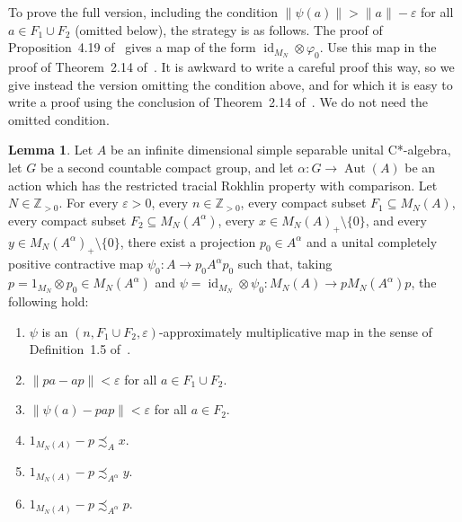 \documentclass[10pt]{amsart}
\numberwithin{equation}{section}
\theoremstyle{definition}
\newtheorem{lem}[thm]{Lemma}
\newcommand{\ep}{\varepsilon}
\newcommand{\ph}{\varphi}
\newcommand{\ps}{\psi}
\newcommand{\N}{{\mathbb{Z}}_{> 0}}
\newcommand{\id}{{\operatorname{id}}}
\newcommand{\Aut}{{\operatorname{Aut}}}
\newcommand{\ca}{C*-algebra}
\begin{document}
To prove the full version, including the condition
$\| \ps (a) \| > \| a \| - \ep$ for all $a \in F_{1} \cup F_{2}$
(omitted below), the strategy is as follows.
The proof of Proposition~4.19 of~\cite{MohPhil2021TRP}
gives a map of the form $\id_{M_N} \otimes \ph_0$.
Use this map in the proof of Theorem~2.14 of~\cite{MohPhil2021TRP}.
It is awkward to write a careful proof this way,
so we give instead the version omitting the condition above,
and for which it is easy to write a proof using the conclusion of
Theorem~2.14 of~\cite{MohPhil2021TRP}.
We do not need the omitted condition.

\begin{lem}\label{L_6327_TRP_Mn}
Let $A$ be an infinite dimensional simple separable unital \ca,
let $G$ be a second countable compact group, and let
$\alpha \colon G \to \Aut (A)$ be an action which has the
restricted tracial Rokhlin property with comparison.
Let $N \in \N$.
For every $\ep > 0$, every $n \in \N$,
every compact subset $F_{1} \subseteq M_N (A)$,
every compact subset $F_2 \subseteq M_N (A^{\alpha})$,
every $x \in M_N (A)_{+} \setminus \{ 0 \}$,
and every $y \in M_N (A^{\alpha})_{+} \setminus \{ 0 \}$, there exist
a projection $p_0 \in A^{\alpha}$ and a
unital completely positive contractive map
$\psi_0 \colon A \to p_0 A^{\alpha} p_0$ such that,
taking $p = 1_{M_N} \otimes p_0 \in M_N (A^{\alpha})$
and $\ps = \id_{M_N} \otimes \psi_0 \colon M_N (A) \to p M_N (A^{\alpha}) p$,
the following hold:
%
\begin{enumerate}
%
\item\label{Item_1X07_18}
$\ps$ is an $(n, F_1 \cup F_2, \ep)$-approximately
multiplicative map in the sense of Definition~1.5 of~\cite{MohPhil2021TRP}.
%
\item\label{commute1469}
$\| p a - a p \| < \varepsilon$
for all $a \in F_{1} \cup F_{2}$.
%
\item\label{Item_1X07_21}
$\| \psi (a) - p a p \| < \ep$
for all $a \in F_2$.
%
\item\label{Item_1X07_19}
$1_{M_N (A)} - p \precsim_{A} x$.
%
\item\label{Item_1X07_20}
$1_{M_N (A)} - p \precsim_{A^{\alpha}} y$.
%
\item\label{Item_1X07_20p}
$1_{M_N (A)} - p \precsim_{A^{\alpha}} p$.
%
\end{enumerate}
\end{lem}
\end{document}

